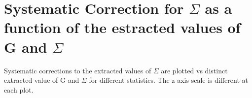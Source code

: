 \section{Systematic Correction for \texorpdfstring{$\Sigma$}{Sigma} as a function of the estracted values of G and \texorpdfstring{$\Sigma$}{Sigma}}
\label{app:Sigma_syscorr}
Systematic corrections to the extracted values of $\Sigma$ are plotted vs distinct extracted value of G and $\Sigma$ for different statistics. The z axis scale is different at each plot.
\begin{figure}[htb]
  \begin{center} 
    \\


\end{center}
\end{figure}
